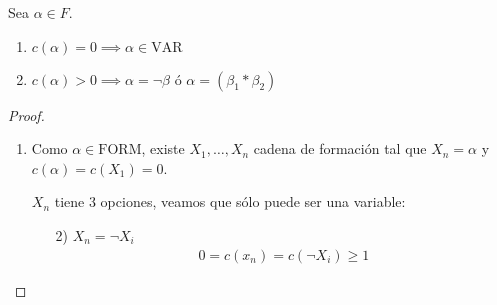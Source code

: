 \begin{lema}{}{}
    Sea $\alpha \in F$.

    \medskip

    \begin{enumerate}
        \item $c(\alpha) = 0 \implies \alpha \in \mathrm{VAR}$
        \item $c(\alpha) > 0 \implies \alpha = \neg \beta$ ó
            $\alpha = (\beta_1 * \beta_2)$
    \end{enumerate}
\end{lema}

\begin{proof} \phantom{.}





    \begin{enumerate}
        \item Como $\alpha \in \mathrm{FORM}$, existe $X_1, \dotsc, X_n$
            cadena de formación tal que 
            $X_n = \alpha$ y $c(\alpha) = c(X_1) = 0$.

            $X_n$ tiene 3 opciones, veamos que sólo puede ser una variable:
            \begin{enumerate}
                \item[2)] $X_n = \neg X_i$ %
                    \begin{gather*}
                        0 = c(x_n) = c(\neg X_i) \geq 1
                    \end{gather*}


\end{enumerate}
\end{enumerate}
\end{proof}
